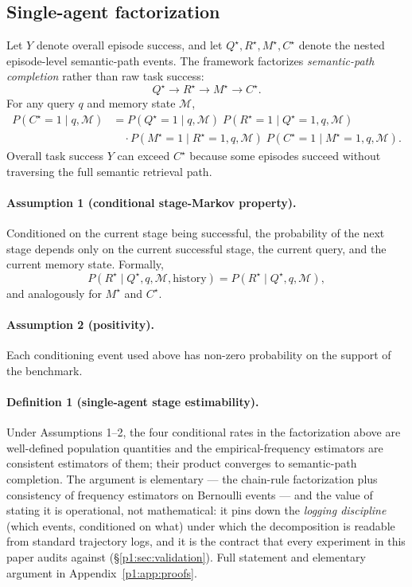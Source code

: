 \documentclass{article}
\begin{document}
\subsection{Single-agent factorization}
\label{p1:sec:single-theory}

Let $Y$ denote overall episode success, and let
$Q^\star, R^\star, M^\star, C^\star$ denote the nested episode-level
semantic-path events. The framework factorizes \emph{semantic-path
completion} rather than raw task success:
\[
Q^\star \rightarrow R^\star \rightarrow M^\star \rightarrow C^\star.
\]
For any query $q$ and memory state $\mathcal{M}$,
\begin{align*}
P(C^\star = 1 \mid q, \mathcal{M})
&=
P(Q^\star = 1 \mid q, \mathcal{M})\;
P(R^\star = 1 \mid Q^\star = 1, q, \mathcal{M}) \\
&\quad \cdot
P(M^\star = 1 \mid R^\star = 1, q, \mathcal{M})\;
P(C^\star = 1 \mid M^\star = 1, q, \mathcal{M}).
\end{align*}
Overall task success $Y$ can exceed $C^\star$ because some episodes
succeed without traversing the full semantic retrieval path.

\paragraph{Assumption 1 (conditional stage-Markov property).}
Conditioned on the current stage being successful, the probability of
the next stage depends only on the current successful stage, the
current query, and the current memory state. Formally,
\[
P(R^\star \mid Q^\star, q, \mathcal{M}, \text{history}) = P(R^\star \mid Q^\star, q, \mathcal{M}),
\]
and analogously for $M^\star$ and $C^\star$.

\paragraph{Assumption 2 (positivity).}
Each conditioning event used above has non-zero probability on the
support of the benchmark.

\paragraph{Definition 1 (single-agent stage estimability).}
Under Assumptions 1--2, the four conditional rates in the factorization above are well-defined population quantities and the empirical-frequency estimators are consistent estimators of them; their product converges to semantic-path completion. The argument is elementary --- the chain-rule factorization plus consistency of frequency estimators on Bernoulli events --- and the value of stating it is operational, not mathematical: it pins down the \emph{logging discipline} (which events, conditioned on what) under which the decomposition is readable from standard trajectory logs, and it is the contract that every experiment in this paper audits against (\S\ref{p1:sec:validation}). Full statement and elementary argument in Appendix~\ref{p1:app:proofs}.
\end{document}

